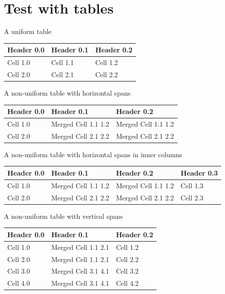 \documentclass[11pt,a4paper]{article}
\begin{document}
\section{Test with tables}

A uniform table

\begin{table}[h]
\begin{tabular}{|l|l|l|}
\hline
\textbf{Header 0.0} & \textbf{Header 0.1} & \textbf{Header 0.2} \\ \hline
Cell 1.0 & Cell 1.1 & Cell 1.2 \\ \hline
Cell 2.0 & Cell 2.1 & Cell 2.2 \\ \hline
\end{tabular}
\end{table}

A non-uniform table with horizontal spans

\begin{table}[h]
\begin{tabular}{|l|l|l|}
\hline
\textbf{Header 0.0} & \textbf{Header 0.1} & \textbf{Header 0.2} \\ \hline
Cell 1.0 & Merged Cell 1.1 1.2 & Merged Cell 1.1 1.2 \\ \hline
Cell 2.0 & Merged Cell 2.1 2.2 & Merged Cell 2.1 2.2 \\ \hline
\end{tabular}
\end{table}

A non-uniform table with horizontal spans in inner columns

\begin{table}[h]
\begin{tabular}{|l|l|l|l|}
\hline
\textbf{Header 0.0} & \textbf{Header 0.1} & \textbf{Header 0.2} & \textbf{Header 0.3} \\ \hline
Cell 1.0 & Merged Cell 1.1 1.2 & Merged Cell 1.1 1.2 & Cell 1.3 \\ \hline
Cell 2.0 & Merged Cell 2.1 2.2 & Merged Cell 2.1 2.2 & Cell 2.3 \\ \hline
\end{tabular}
\end{table}

A non-uniform table with vertical spans

\begin{table}[h]
\begin{tabular}{|l|l|l|}
\hline
\textbf{Header 0.0} & \textbf{Header 0.1} & \textbf{Header 0.2} \\ \hline
Cell 1.0 & Merged Cell 1.1 2.1 & Cell 1.2 \\ \hline
Cell 2.0 & Merged Cell 1.1 2.1 & Cell 2.2 \\ \hline
Cell 3.0 & Merged Cell 3.1 4.1 & Cell 3.2 \\ \hline
Cell 4.0 & Merged Cell 3.1 4.1 & Cell 4.2 \\ \hline
\end{tabular}
\end{table}
\end{document}
